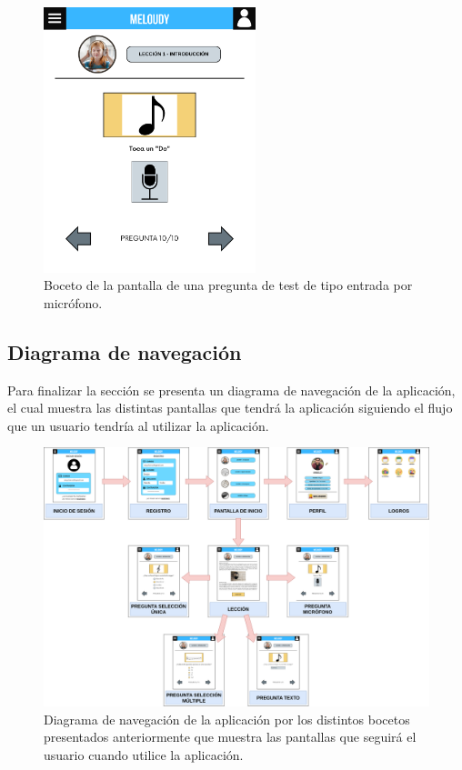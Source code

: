 \begin{figure}[H]
    \centering
    \centerline{\includegraphics[width=0.55\textwidth, frame]{imagenes/c6/8.png}}
    \caption{Boceto de la pantalla de una pregunta de test de tipo entrada por micrófono.}
    \label{fig:microfono}
\end{figure}

\newpage

\subsection*{Diagrama de navegación}

Para finalizar la sección se presenta un diagrama de navegación de la aplicación, el cual muestra las distintas pantallas que tendrá la aplicación siguiendo el flujo que un usuario tendría al utilizar la aplicación.
\begin{figure}[H]
    \centering
    \centerline{\includegraphics[width=1.2\textwidth]{imagenes/c6/diagrambocetos.png}}
    \caption{Diagrama de navegación de la aplicación por los distintos bocetos presentados anteriormente que muestra las pantallas que seguirá el usuario cuando utilice la aplicación.}
    \label{fig:microfono}
\end{figure}

